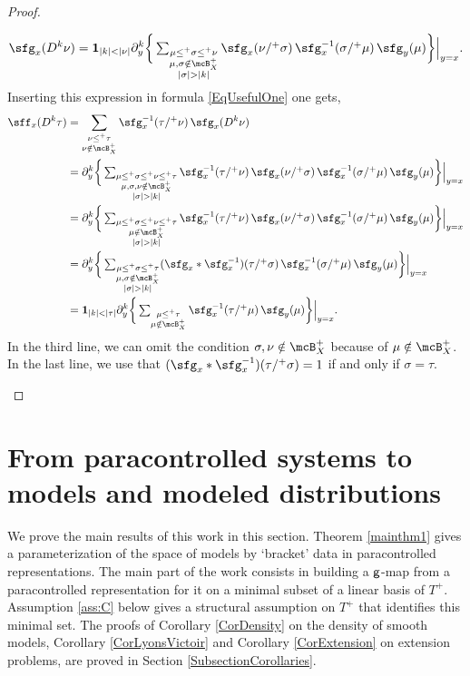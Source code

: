 \begin{proof}
\begin{itemize}
\[
\sfg_x(D^k\nu) = {\bf1}_{|k|<|\nu|}\partial_y^k \bigg\{\textstyle\sum_{\substack{\mu\le^+\sigma\le^+\nu \\ \mu,\sigma\notin\mcB_X^+\\|\sigma|>|k|}} \sfg_x(\nu/^+\sigma)\,\sfg_x^{-1}(\sigma/^+\mu)\,\sfg_y(\mu)\bigg\}\Big|_{y=x}.
\]
Inserting this expression in formula \eqref{EqUsefulOne} one gets,
\begin{align*}
\sff_x(D^k\tau)
&= \sum_{\substack{\nu\le^+\tau\\\nu\notin\mcB_X^+}} \sfg_x^{-1}(\tau/^+\nu)\,\sfg_x(D^k\nu) \\
&= \partial_y^k \bigg\{\textstyle\sum_{\substack{\mu\le^+\sigma\le^+\nu\le^+\tau \\ \mu,\sigma,\nu\notin\mcB_X^+\\|\sigma|>|k|}} \sfg_x^{-1}(\tau/^+\nu)\,\sfg_x(\nu/^+\sigma)\,\sfg_x^{-1}(\sigma/^+\mu)\,\sfg_y(\mu)\bigg\}\Big|_{y=x} \\
&= \partial_y^k \bigg\{\textstyle\sum_{\substack{\mu\le^+\sigma\le^+\nu\le^+\tau \\ \mu\notin\mcB_X^+\\|\sigma|>|k|}} \sfg_x^{-1}(\tau/^+\nu)\,\sfg_x(\nu/^+\sigma)\,\sfg_x^{-1}(\sigma/^+\mu)\,\sfg_y(\mu)\bigg\}\Big|_{y=x} \\
&= \partial_y^k \bigg\{\textstyle\sum_{\substack{\mu\le^+\sigma\le^+\tau \\ \mu,\sigma\notin\mcB_X^+\\|\sigma|>|k|}} (\sfg_x*\sfg_x^{-1})(\tau/^+\sigma)\,\sfg_x^{-1}(\sigma/^+\mu)\,\sfg_y(\mu)\bigg\}\Big|_{y=x} \\
&= {\bf1}_{|k|<|\tau|}\partial_y^k \bigg\{\textstyle\sum_{\substack{\mu\le^+\tau\\ \mu\notin\mcB_X^+}}\sfg_x^{-1}(\tau/^+\mu)\,\sfg_y(\mu)\bigg\}\Big|_{y=x}.
\end{align*}
In the third line, we can omit the condition $\sigma,\nu\notin\mcB_X^+$ because of $\mu\notin\mcB_X^+$.
In the last line, we use that $(\sfg_x*\sfg_x^{-1})(\tau/^+\sigma)=1$ if and only if $\sigma=\tau$.\qedhere
\end{itemize}
\end{proof}

\section{From paracontrolled systems to models and modeled distributions}
\label{SectionPCtoRS}

We prove the main results of this work in this section. Theorem \ref{mainthm1} gives a parameterization of the space of models by `bracket' data in paracontrolled representations. The main part of the work consists in building a $\sf g$-map from a paracontrolled representation for it on a minimal subset of a linear basis of $T^+$. Assumption \eqref{ass:C} below gives a structural assumption on $T^+$ that identifies this minimal set. The proofs of Corollary \ref{CorDensity} on the density of smooth models, Corollary \ref{CorLyonsVictoir} and Corollary \ref{CorExtension} on extension problems, are proved in Section \ref{SubsectionCorollaries}.

